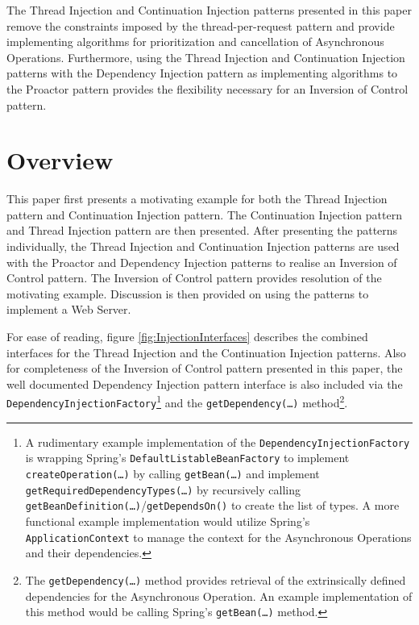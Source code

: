 \documentclass[prodmode]{style/acmlarge}
\begin{document}
The Thread Injection and Continuation Injection patterns presented in this paper
remove the constraints imposed by the thread-per-request pattern and provide
implementing algorithms for prioritization and cancellation of Asynchronous
Operations.  Furthermore, using the Thread Injection and Continuation Injection
patterns with the Dependency Injection pattern \cite{ioc} as implementing
algorithms to the Proactor pattern provides the flexibility necessary for an
Inversion of Control pattern.


\section{Overview}

This paper first presents a motivating example for both the Thread Injection
pattern and Continuation Injection pattern.  The Continuation Injection pattern
and Thread Injection pattern are then presented.  After presenting the patterns
individually, the Thread Injection and Continuation Injection patterns are used
with the Proactor and Dependency Injection patterns to realise an Inversion of
Control pattern.  The Inversion of Control pattern provides resolution of the
motivating example.  Discussion is then provided on using the patterns to
implement a Web Server.

For ease of reading, figure \ref{fig:InjectionInterfaces} describes the combined
interfaces for the Thread Injection and the Continuation Injection patterns.
Also for completeness of the Inversion of Control pattern presented in this
paper, the well documented Dependency Injection pattern \cite{ioc} interface is
also included via the \texttt{DependencyInjectionFactory}\footnote{A rudimentary
example implementation of the \texttt{DependencyInjectionFactory} is wrapping
Spring's \cite{spring} \texttt{DefaultListableBeanFactory} to implement
\texttt{createOperation(\ldots)} by calling \texttt{getBean(\ldots)} and
implement \texttt{getRequiredDependencyTypes(\ldots)} by recursively calling
\texttt{getBeanDefinition(\ldots)}/\texttt{getDependsOn()} to create the list of
types.  A more functional example implementation would utilize Spring's
\texttt{ApplicationContext} to manage the context for the Asynchronous
Operations and their dependencies.} and the \texttt{getDependency(\ldots)}
method\footnote{The \texttt{getDependency(\ldots)} method provides retrieval of
the extrinsically defined dependencies for the Asynchronous Operation.  An
example implementation of this method would be calling Spring's \cite{spring}
\texttt{getBean(\ldots)} method.}.
\end{document}
